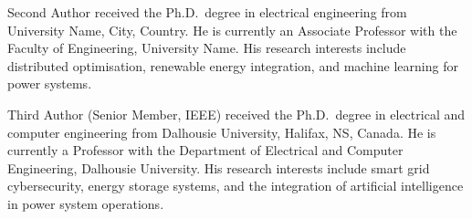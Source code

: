 \documentclass[journal]{IEEEtran}
\begin{document}
\begin{IEEEbiographynophoto}{Second Author}
received the Ph.D.\ degree in electrical engineering from University
Name, City, Country. He is currently an Associate Professor with the
Faculty of Engineering, University Name. His research interests include
distributed optimisation, renewable energy integration, and machine
learning for power systems.
\end{IEEEbiographynophoto}

\begin{IEEEbiographynophoto}{Third Author}
(Senior Member, IEEE) received the Ph.D.\ degree in electrical and
computer engineering from Dalhousie University, Halifax, NS, Canada.
He is currently a Professor with the Department of Electrical and
Computer Engineering, Dalhousie University. His research interests
include smart grid cybersecurity, energy storage systems, and the
integration of artificial intelligence in power system operations.
\end{IEEEbiographynophoto}
\end{document}
